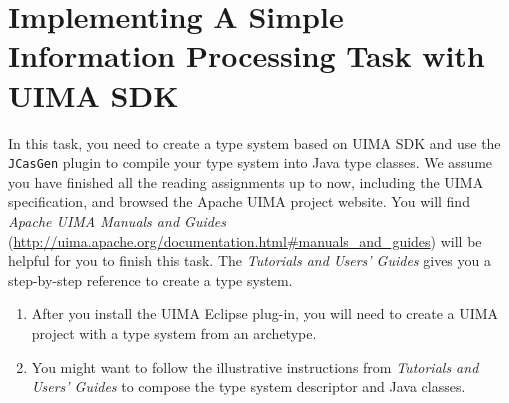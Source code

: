 
\chapter{Implementing A Simple Information Processing Task with UIMA SDK}

In this task, you need to create a type system based on UIMA SDK and use the
\texttt{JCasGen} plugin to compile your type system into Java type classes.
We assume you have finished all the reading assignments up to now, including the
UIMA specification, and browsed the Apache UIMA project website. You will find
\emph{Apache UIMA Manuals and Guides}
(\url{http://uima.apache.org/documentation.html#manuals_and_guides}) will be
helpful for you to finish this task. The \emph{Tutorials and Users' Guides}
gives you a step-by-step reference to create a type system.

\begin{enumerate}

\item After you install the UIMA Eclipse plug-in, you will need to create a
UIMA project with a type system from an archetype.

\item You might want to follow the illustrative instructions from
\emph{Tutorials and Users' Guides} to compose the type system descriptor and
Java classes.

\end{enumerate}








